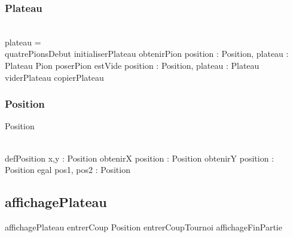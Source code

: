 \begin{algorithme}
				\subsubsection{Plateau}
				\\
				plateau = 
				\\
				\signatureprocedure
				{quatrePionsDebut}
				{}
				\signatureprocedure
				{initialiserPlateau}
				{}
				\signaturefonction
				{obtenirPion}
				{position : Position, plateau : Plateau}
				{Pion}
				\signatureprocedure
				{poserPion}
				{}
				\signaturefonction
				{estVide}
				{position : Position, plateau : Plateau}
				{\booleen}
				\signatureprocedure
				{viderPlateau}
				{}
				\signatureprocedure
				{copierPlateau}
				{}
				\subsubsection{Position}
				\begin{enregistrement}
					{Position}
				\end{enregistrement}
				\\
				\signaturefonction
				{defPosition}
				{x,y : \caractere}
				{Position}
				\signaturefonction
				{obtenirX}
				{position : Position}
				{\caractere}
				\signaturefonction
				{obtenirY}
				{position : Position}
				{\caractere}
				\signaturefonction
				{egal}
				{pos1, pos2 : Position}
				{\booleen}
				
				
				
			\end{algorithme}
			\subsection{affichagePlateau}
				\begin{algorithme}
					\signatureprocedure
						{affichagePlateau}		{}
					\signaturefonction
					{entrerCoup }					{}
					{Position}
					\signatureprocedure
					{entrerCoupTournoi}					{}
					\signatureprocedure
					{affichageFinPartie}					{}
				\end{algorithme}
